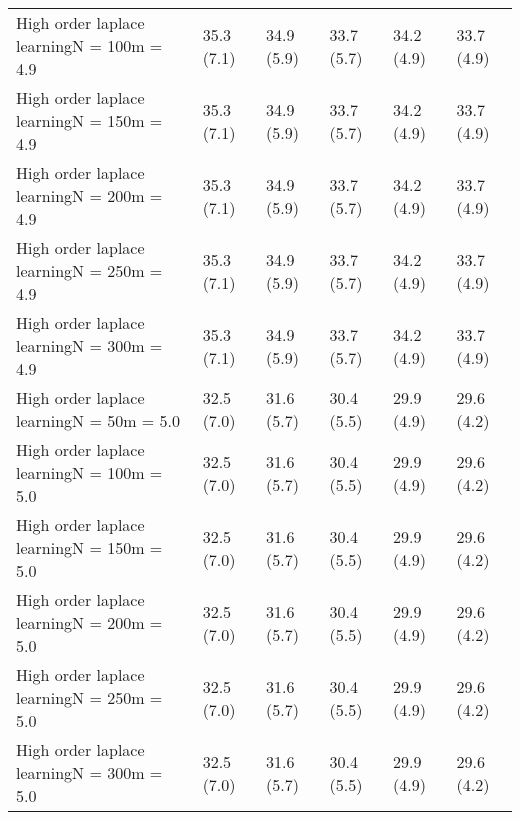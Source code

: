 \documentclass{article}
\begin{document}
\begin{table*}[t!]
\begin{center}
\begin{small}
\begin{sc}
\begin{tabular}{llllll}
High order laplace learningN = 100m = 4.9&35.3 (7.1)      &34.9 (5.9)      &33.7 (5.7)      &34.2 (4.9)      &33.7 (4.9)      \\
High order laplace learningN = 150m = 4.9&35.3 (7.1)      &34.9 (5.9)      &33.7 (5.7)      &34.2 (4.9)      &33.7 (4.9)      \\
High order laplace learningN = 200m = 4.9&35.3 (7.1)      &34.9 (5.9)      &33.7 (5.7)      &34.2 (4.9)      &33.7 (4.9)      \\
High order laplace learningN = 250m = 4.9&35.3 (7.1)      &34.9 (5.9)      &33.7 (5.7)      &34.2 (4.9)      &33.7 (4.9)      \\
High order laplace learningN = 300m = 4.9&35.3 (7.1)      &34.9 (5.9)      &33.7 (5.7)      &34.2 (4.9)      &33.7 (4.9)      \\
High order laplace learningN = 50m = 5.0&32.5 (7.0)      &31.6 (5.7)      &30.4 (5.5)      &29.9 (4.9)      &29.6 (4.2)      \\
High order laplace learningN = 100m = 5.0&32.5 (7.0)      &31.6 (5.7)      &30.4 (5.5)      &29.9 (4.9)      &29.6 (4.2)      \\
High order laplace learningN = 150m = 5.0&32.5 (7.0)      &31.6 (5.7)      &30.4 (5.5)      &29.9 (4.9)      &29.6 (4.2)      \\
High order laplace learningN = 200m = 5.0&32.5 (7.0)      &31.6 (5.7)      &30.4 (5.5)      &29.9 (4.9)      &29.6 (4.2)      \\
High order laplace learningN = 250m = 5.0&32.5 (7.0)      &31.6 (5.7)      &30.4 (5.5)      &29.9 (4.9)      &29.6 (4.2)      \\
High order laplace learningN = 300m = 5.0&32.5 (7.0)      &31.6 (5.7)      &30.4 (5.5)      &29.9 (4.9)      &29.6 (4.2)      \\
\bottomrule
\end{tabular}
\end{sc}
\end{small}
\end{center}
\vskip -0.1in
\end{table*}
\end{document}
